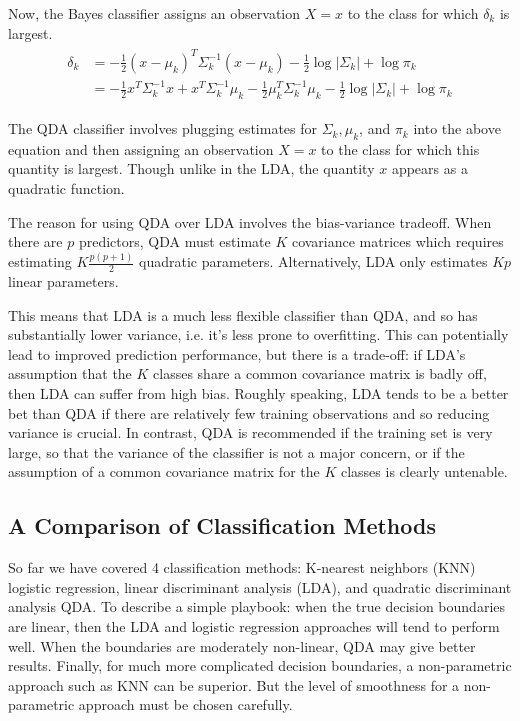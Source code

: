 \documentclass{article}
\numberwithin{equation}{section}
\begin{document}
\begin{enumerate}
Now, the Bayes classifier assigns an observation $X = x$ to the class for which $\delta_k$ is largest.
\begin{align}
\begin{split}
    \delta_k &= - \frac{1}{2}(x-\mu_k)^T \Sigma_k^{-1} (x-\mu_k) - \frac{1}{2}\log|\Sigma_k | + \log \pi_k \\
    &= - \frac{1}{2} x^T \Sigma^{-1}_k x + x^T \Sigma^{-1}_k \mu_k - \frac{1}{2} \mu_k^T \Sigma^{-1}_k  \mu_k - \frac{1}{2} \log |\Sigma_k| + \log \pi_k
\end{split}
\end{align}

The QDA classifier involves plugging estimates for $\Sigma_k, \mu_k$, and $\pi_k$ into the above equation and then assigning an observation $X = x$ to the class for which this quantity is largest. Though unlike in the LDA, the quantity $x$ appears as a quadratic function.

The reason for using QDA over LDA involves the bias-variance tradeoff. When
there are $p$ predictors, QDA must estimate $K$ covariance matrices which requires estimating $K \frac{p(p+1)}{2}$ quadratic parameters. Alternatively, LDA only estimates $Kp$ linear parameters. 

This means that LDA is a much less flexible classifier than QDA, and so has substantially lower variance, i.e. it's less prone to overfitting. This can potentially lead to improved prediction performance, but there is a trade-off: if LDA’s assumption that the $K$ classes share a common covariance matrix is badly off, then LDA can suffer from high bias. Roughly speaking, LDA tends to be a better bet than QDA if there are relatively few training observations and so reducing variance is crucial. In contrast, QDA is recommended if the training set is very large, so that the variance of the classifier is not a major concern, or if the assumption of a common covariance matrix for the $K$ classes is clearly untenable.

\subsection{A Comparison of Classification Methods}
So far we have covered 4 classification methods:  K-nearest neighbors (KNN) logistic regression, linear discriminant analysis (LDA), and quadratic discriminant analysis QDA. To describe a simple playbook: when the true decision boundaries are linear, then the LDA and logistic regression approaches will tend to perform well. When the boundaries are moderately non-linear, QDA may give better results. Finally, for much more complicated decision boundaries, a non-parametric approach such as KNN can be superior. But the level of smoothness for a non-parametric approach must be chosen carefully.


\end{enumerate}
\end{document}
